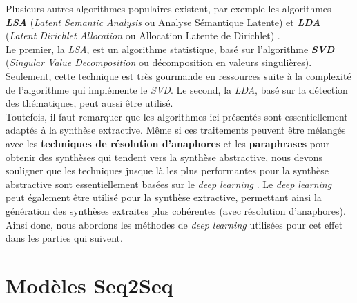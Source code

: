 Plusieurs autres algorithmes populaires existent, par exemple les algorithmes \textit{\textbf{LSA}} (\textit{Latent Semantic Analysis} ou Analyse Sémantique Latente) et \textit{\textbf{LDA}} (\textit{Latent Dirichlet Allocation} ou Allocation Latente de Dirichlet) \cite{berry2010text}.\\
Le premier, la \textit{LSA}, est un algorithme statistique, basé sur l'algorithme \textit{\textbf{SVD}} (\textit{Singular Value Decomposition} ou décomposition en valeurs singulières). Seulement, cette technique est très gourmande en ressources suite à la complexité de l'algorithme qui implémente le \textit{SVD}. Le second, la \textit{LDA}, basé sur la détection des thématiques, peut aussi être utilisé.\\

Toutefois, il faut remarquer que les algorithmes ici présentés sont essentiellement adaptés à la synthèse extractive. Même si ces traitements peuvent être mélangés avec les \textbf{techniques de résolution d'anaphores} et les \textbf{paraphrases} pour obtenir des synthèses qui tendent vers la synthèse abstractive, nous devons souligner que les techniques jusque là les plus performantes pour la synthèse abstractive sont essentiellement basées sur le \textit{deep learning} \cite{MaaliMnasri}. Le \textit{deep learning} peut également être utilisé pour la synthèse extractive, permettant ainsi la génération des synthèses extraites plus cohérentes (avec résolution d'anaphores). Ainsi donc, nous abordons les méthodes de \textit{deep learning} utilisées pour cet effet dans les parties qui suivent.
\section{Modèles Seq2Seq}\label{SectionSeq2Seq}
